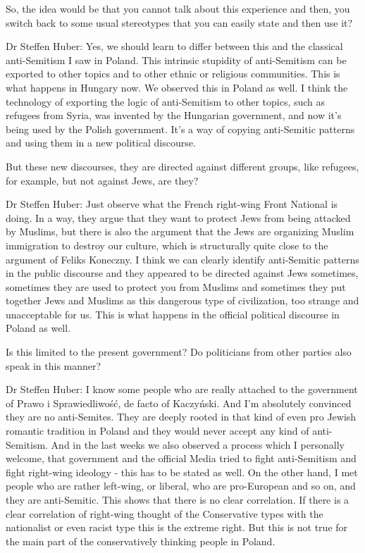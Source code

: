   

So, the idea would be that you cannot talk about this experience and then, you switch back to some usual stereotypes that you can easily state and then use it?  

 

Dr Steffen Huber: Yes, we should learn to differ between this and the classical anti-Semitism I saw in Poland. This intrinsic stupidity of anti-Semitism can be exported to other topics and to other ethnic or religious communities. This is what happens in Hungary now. We observed this in Poland as well. I think the technology of exporting the logic of anti-Semitism to other topics, such as refugees from Syria, was invented by the Hungarian government, and now it's being used by the Polish government. It’s a way of copying anti-Semitic patterns and using them in a new political discourse. 

 

But these new discourses, they are directed against different groups, like refugees, for example, but not against Jews, are they?   

 

Dr Steffen Huber: Just observe what the French right-wing Front National is doing. In a way, they argue that they want to protect Jews from being attacked by Muslims, but there is also the argument that the Jews are organizing Muslim immigration to destroy our culture, which is structurally quite close to the argument of Feliks Koneczny. I think we can clearly identify anti-Semitic patterns in the public discourse and they appeared to be directed against Jews sometimes, sometimes they are used to protect you from Muslims and sometimes they put together Jews and Muslims as this dangerous type of civilization, too strange and unacceptable for us. This is what happens in the official political discourse in Poland as well. 

 

Is this limited to the present government? Do politicians from other parties also speak in this manner? 

 

Dr Steffen Huber: I know some people who are really attached to the government of Prawo i Sprawiedliwość, de facto of Kaczyński. And I'm absolutely convinced they are no anti-Semites. They are deeply rooted in that kind of even pro Jewish romantic tradition in Poland and they would never accept any kind of anti-Semitism. And in the last weeks we also observed a process which I personally welcome, that government and the official Media tried to fight anti-Semitism and fight right-wing ideology - this has to be stated as well. On the other hand, I met people who are rather left-wing, or liberal, who are pro-European and so on, and they are anti-Semitic. This shows that there is no clear correlation. If there is a clear correlation of right-wing thought of the Conservative types with the nationalist or even racist type this is the extreme right. But this is not true for the main part of the conservatively thinking people in Poland.  


